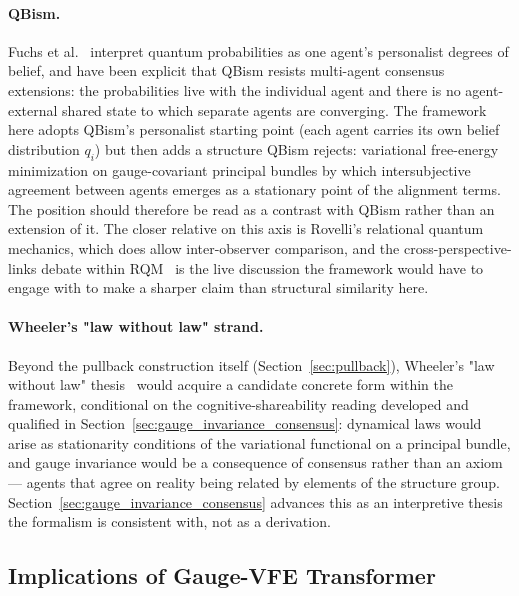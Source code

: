 \documentclass[11pt]{article}
\begin{document}
\paragraph{QBism.} Fuchs et al.\ \cite{Fuchs2014, Fuchs2017} interpret quantum probabilities as one agent's personalist degrees of belief, and have been explicit that QBism resists multi-agent consensus extensions: the probabilities live with the individual agent and there is no agent-external shared state to which separate agents are converging. The framework here adopts QBism's personalist starting point (each agent carries its own belief distribution $q_i$) but then adds a structure QBism rejects: variational free-energy minimization on gauge-covariant principal bundles by which intersubjective agreement between agents emerges as a stationary point of the alignment terms. The position should therefore be read as a contrast with QBism rather than an extension of it. The closer relative on this axis is Rovelli's relational quantum mechanics, which does allow inter-observer comparison, and the cross-perspective-links debate within RQM~\cite{Brukner2018, AdlamRovelli2022} is the live discussion the framework would have to engage with to make a sharper claim than structural similarity here.

\paragraph{Wheeler's "law without law" strand.} Beyond the pullback construction itself (Section~\ref{sec:pullback}), Wheeler's "law without law" thesis~\cite{Wheeler1990} would acquire a candidate concrete form within the framework, conditional on the cognitive-shareability reading developed and qualified in Section~\ref{sec:gauge_invariance_consensus}: dynamical laws would arise as stationarity conditions of the variational functional on a principal bundle, and gauge invariance would be a consequence of consensus rather than an axiom --- agents that agree on reality being related by elements of the structure group. Section~\ref{sec:gauge_invariance_consensus} advances this as an interpretive thesis the formalism is consistent with, not as a derivation.

\subsection{Implications of Gauge-VFE Transformer}
\end{document}
